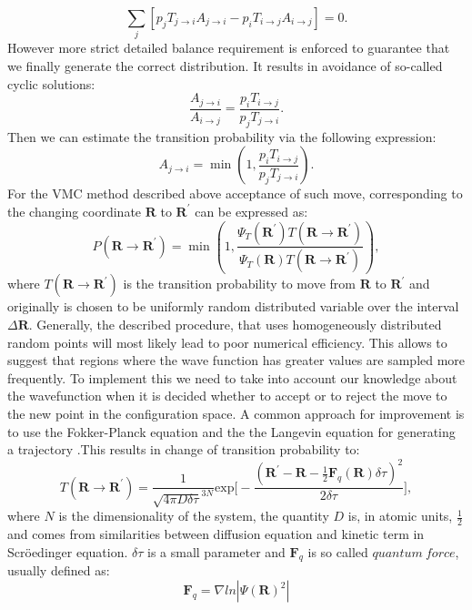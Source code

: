 \documentclass[twoside,english]{uiofysmaster}
\begin{document}
\begin{equation}
\sum_j \left [
p_jT_{j\rightarrow i} A_{j\rightarrow i}
-p_iT_{i\rightarrow j}A_{i\rightarrow j}
\right ] = 0 .
\end{equation}
However more strict detailed balance requirement is enforced to guarantee that we finally generate the correct distribution. It results in avoidance of so-called cyclic solutions\cite{Hjorth-Jensenadvancedcoursecomputational2017}:
\begin{equation}
\frac{ A_{j\rightarrow i}}{A_{i\rightarrow j}}
= \frac{p_iT_{i\rightarrow j}}{ p_jT_{j\rightarrow i}}.
\end{equation}
Then we can estimate the transition probability via the following expression: 
\begin{equation}
A_{j \rightarrow i} = \min \left ( 1,
\frac{p_iT_{i\rightarrow j}}{ p_jT_{j\rightarrow i}}\right ).
\end{equation}
For the VMC method described above acceptance of such move, corresponding to the changing coordinate $\boldsymbol{R}$ to $\boldsymbol{R}^\prime$ can be expressed as: 
\begin{equation}
P({\boldsymbol{R} \rightarrow \boldsymbol{R}^\prime}) = \min \left ( 1,
\frac{\Psi_T(\boldsymbol{R}^\prime)T(\boldsymbol{R} \rightarrow \boldsymbol{R}^\prime)}{ \Psi_T(\boldsymbol{R})T(\boldsymbol{R} \rightarrow \boldsymbol{R}^\prime)}\right ),
\end{equation}
where $T(\boldsymbol{R} \rightarrow \boldsymbol{R}^\prime)$ is the transition probability to move from $\boldsymbol{R}$ to $\boldsymbol{R}^\prime$ and originally is chosen to be uniformly random distributed variable over the interval $\Delta \boldsymbol{R}$. Generally, the described procedure, that uses homogeneously distributed random points will most likely lead to poor numerical efficiency. This allows to suggest that regions where the wave function has greater values are sampled more frequently. To implement this we need to take into account our knowledge about the wavefunction when it is  decided whether to accept or to reject the move to the new point in the configuration space. A common approach for improvement is to use the Fokker-Planck equation and the the Langevin equation for generating a trajectory \cite{VanKampenStochasticProcessesPhysics2007}.This results in change of transition probability to:
\begin{equation}
T(\boldsymbol{R} \rightarrow \boldsymbol{R}^\prime) = \frac{1}{\sqrt{4\pi D\delta\tau}^{3N}} \text{exp}\Bigg[-\frac{(\boldsymbol{R}^\prime - \boldsymbol{R} -\frac{1}{2}\boldsymbol{F}_q(\boldsymbol{R})\delta \tau)^2}{2\delta \tau}\Bigg],
\end{equation}
where $N$ is the dimensionality of the system, the quantity $D$ is, in atomic units, $\frac{1}{2}$ and comes from similarities between diffusion equation and kinetic term in Scr\"{o}edinger equation. $\delta \tau$ is a small parameter and $\boldsymbol{F}_q$ is so called $quantum\ force$, usually defined as:
\begin{equation}
	\boldsymbol{F}_q = \nabla ln|\Psi(\boldsymbol{R})^2|
\end{equation}
\end{document}
